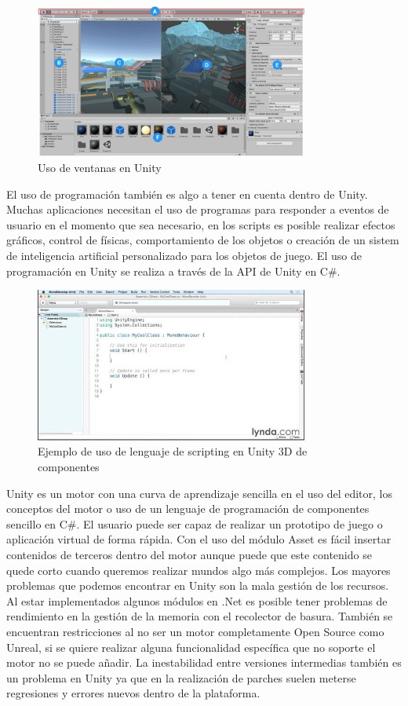 \documentclass[a4paper]{book}
\begin{document}
\begin{figure}[H]
    \centering
    \includegraphics[width=9cm, keepaspectratio]{img/editor_unity.png}
    \caption{Uso de ventanas en Unity}
    \label{editor_unity}
\end{figure}

El uso de programación también es algo a tener en cuenta dentro de Unity. Muchas aplicaciones necesitan el uso
de programas para responder a eventos de usuario en el momento que sea necesario, en los scripts es posible
realizar efectos gráficos, control de físicas, comportamiento de los objetos o creación de un sistem de inteligencia
artificial personalizado para los objetos de juego. El uso de programación en Unity se realiza a través de la
API de Unity en C\#.

\begin{figure}[H]
    \centering
    \includegraphics[width=9cm, keepaspectratio]{img/APIUnity.jpg}
    \caption{Ejemplo de uso de lenguaje de scripting en Unity 3D de componentes}
    \label{APIUnity}
\end{figure}

Unity es un motor con una curva de aprendizaje sencilla en el uso del editor, los conceptos del motor o uso de un
lenguaje de programación de componentes sencillo en C\#. El usuario puede ser capaz de realizar un prototipo de
juego o aplicación virtual de forma rápida. Con el uso del módulo Asset es fácil insertar contenidos de terceros
dentro del motor aunque puede que este contenido se quede corto cuando queremos realizar mundos algo más complejos. Los mayores
problemas que podemos encontrar en Unity son la mala gestión de los recursos. Al estar implementados
algunos módulos en .Net es posible tener problemas de rendimiento en la gestión de la memoria con el recolector de basura. También se
encuentran restricciones al no ser un motor completamente Open Source como Unreal, si se quiere realizar
alguna funcionalidad específica que no soporte el motor no se puede añadir. La inestabilidad entre versiones intermedias
también es un problema en Unity ya que en la realización de parches suelen meterse regresiones y errores nuevos dentro de la plataforma. \cite{unity:_manual}
\end{document}
